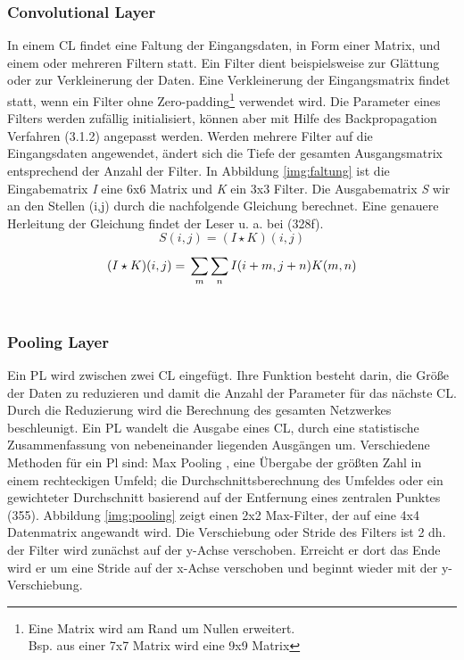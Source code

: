 \documentclass[twosided,a4,10pt]{article}
\begin{document}
\begin{multicols}{2}
		\subsubsection*{Convolutional Layer}
		In einem CL findet eine Faltung der Eingangsdaten, in Form einer Matrix, und einem oder mehreren Filtern statt. Ein Filter dient beispielsweise zur Glättung oder zur Verkleinerung der Daten. Eine Verkleinerung der Eingangsmatrix findet statt, wenn ein Filter ohne Zero-padding\footnote[11]{Eine Matrix wird am Rand um Nullen erweitert.\\ Bsp. aus einer 7x7 Matrix wird eine 9x9 Matrix} verwendet wird. Die Parameter eines Filters werden zufällig initialisiert, können aber mit Hilfe des Backpropagation Verfahren (3.1.2) angepasst werden. Werden mehrere Filter auf die Eingangsdaten angewendet, ändert sich die Tiefe der gesamten Ausgangsmatrix entsprechend der Anzahl der Filter. \cite{karpathy}\newline
		In Abbildung \ref{img:faltung} ist die Eingabematrix \textit{I} eine 6x6 Matrix und \textit{K} ein 3x3 Filter. Die Ausgabematrix \textit{S} wir an den Stellen (i,j) durch die nachfolgende Gleichung berechnet. Eine genauere Herleitung der Gleichung findet der Leser u. a. bei \cite{goodfellow}(328f).\newline\\
		
		\begin{equation*}
		S(i,j) =(I \star K)(i,j)
		\end{equation*}
		\begin{equation*}
		(I \star K)(i,j) =\newline\sum_{m}^{}\sum_{n}^{}I(i+m,j+n)K(m,n)
		\end{equation*}\newline\\
		
		\subsubsection*{Pooling Layer}
		Ein PL wird zwischen zwei CL eingefügt. Ihre Funktion besteht darin, die Größe der Daten zu reduzieren und damit die Anzahl der Parameter für das nächste CL. Durch die Reduzierung wird die Berechnung des gesamten Netzwerkes beschleunigt. \cite{karpathy}\newline Ein PL wandelt die Ausgabe eines CL, durch eine statistische Zusammenfassung von nebeneinander liegenden Ausgängen um. Verschiedene Methoden für ein Pl sind: Max Pooling \cite{zhou}, eine Übergabe der größten Zahl in einem rechteckigen Umfeld; die Durchschnittsberechnung des Umfeldes oder ein gewichteter Durchschnitt basierend auf der Entfernung eines zentralen Punktes \cite{goodfellow}(355).\newline
		Abbildung \ref{img:pooling} zeigt einen 2x2 Max-Filter, der auf eine 4x4 Datenmatrix angewandt wird. Die Verschiebung oder Stride des Filters ist 2 dh. der Filter wird zunächst auf der y-Achse verschoben. Erreicht er dort das Ende wird er um eine Stride auf der x-Achse verschoben und beginnt wieder mit der y-Verschiebung.\newline\\
		

\end{multicols}
\end{document}
